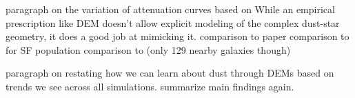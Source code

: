 




paragraph on the variation of attenuation curves based on 
While an empirical prescription like DEM doesn't allow explicit modeling of the
complex dust-star geometry, it does a good job at mimicking it. 
comparison to \cite{narayanan2018} paper 
comparison to \cite{salim2018} for SF population  
comparison to \cite{leja2017} (only 129 nearby galaxies though) 


paragraph on restating how we can learn about dust through DEMs based on trends we see
across all simulations. summarize main findings again. 

